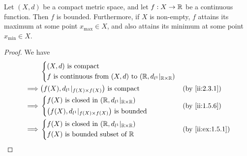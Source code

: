 \begin{prop}\label{ii:2.3.2}
  Let \((X, d)\) be a compact metric space, and let \(f : X \to \mathbb{R}\) be a continuous function.
  Then \(f\) is bounded.
  Furthermore, if \(X\) is non-empty, \(f\) attains its maximum at some point \(x_{\max} \in X\), and also attains its minimum at some point \(x_{\min} \in X\).
\end{prop}

\begin{proof}
  We have
  \begin{align*}
             & \begin{dcases}
                 (X, d) \text{ is compact} \\
                 f \text{ is continuous from } (X, d) \text{ to } (\R, d_{l^1}|_{\R \times \R})
               \end{dcases}                  \\
    \implies & \big(f(X), d_{l^1}|_{f(X) \times f(X)}\big) \text{ is compact}                 &  & \by{ii:2.3.1} \\
    \implies & \begin{dcases}
                 f(X) \text{ is closed in } (\R, d_{l^1}|_{\R \times \R}) \\
                 \big(f(X), d_{l^1}|_{f(X) \times f(X)}\big) \text{ is bounded}
               \end{dcases}                 &  & \by{ii:1.5.6}                                  \\
    \implies & \begin{dcases}
                 f(X) \text{ is closed in } (\R, d_{l^1}|_{\R \times \R}) \\
                 f(X) \text{ is bounded subset of } \R
               \end{dcases}                    &  & \by{ii:ex:1.5.1}
  \end{align*}


\end{proof}
